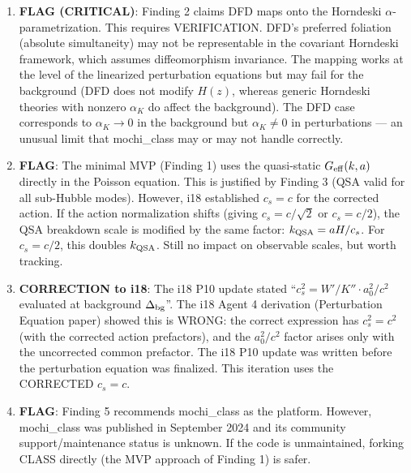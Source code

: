 \documentclass[11pt]{article}
\theoremstyle{definition}
\theoremstyle{remark}
\newcommand{\Geff}{G_{\rm eff}}
\begin{document}
\begin{tcolorbox}[colback=red!5!white, colframe=red!60!black,
  title=\textbf{INCONSISTENCIES AND FLAGS}]
\begin{enumerate}[nosep]
\item \textbf{FLAG (CRITICAL)}: Finding 2 claims DFD maps onto the Horndeski
  $\alpha$-parametrization. This requires VERIFICATION. DFD's preferred
  foliation (absolute simultaneity) may not be representable in the
  covariant Horndeski framework, which assumes diffeomorphism invariance.
  The mapping works at the level of the linearized perturbation equations
  but may fail for the background (DFD does not modify $H(z)$, whereas
  generic Horndeski theories with nonzero $\alpha_K$ do affect the
  background). The DFD case corresponds to $\alpha_K \to 0$ in the
  background but $\alpha_K \neq 0$ in perturbations --- an unusual
  limit that mochi\_class may or may not handle correctly.

\item \textbf{FLAG}: The minimal MVP (Finding 1) uses the quasi-static
  $\Geff(k,a)$ directly in the Poisson equation. This is justified by
  Finding 3 (QSA valid for all sub-Hubble modes). However, i18 established
  $c_s = c$ for the corrected action. If the action normalization shifts
  (giving $c_s = c/\sqrt{2}$ or $c_s = c/2$), the QSA breakdown
  scale is modified by the same factor: $k_{\rm QSA} = aH/c_s$.
  For $c_s = c/2$, this doubles $k_{\rm QSA}$. Still no impact on
  observable scales, but worth tracking.

\item \textbf{CORRECTION to i18}: The i18 P10 update stated
  ``$c_s^2 = W'/K'' \cdot a_0^2/c^2$ evaluated at background
  $\Delta_{\rm bg}$''. The i18 Agent 4 derivation (Perturbation
  Equation paper) showed this is WRONG: the correct expression
  has $c_s^2 = c^2$ (with the corrected action prefactors), and
  the $a_0^2/c^2$ factor arises only with the uncorrected common
  prefactor. The i18 P10 update was written before the perturbation
  equation was finalized. This iteration uses the CORRECTED $c_s = c$.

\item \textbf{FLAG}: Finding 5 recommends mochi\_class as the platform.
  However, mochi\_class was published in September 2024 and its
  community support/maintenance status is unknown. If the code is
  unmaintained, forking CLASS directly (the MVP approach of Finding 1)
  is safer.
\end{enumerate}
\end{tcolorbox}
\end{document}
